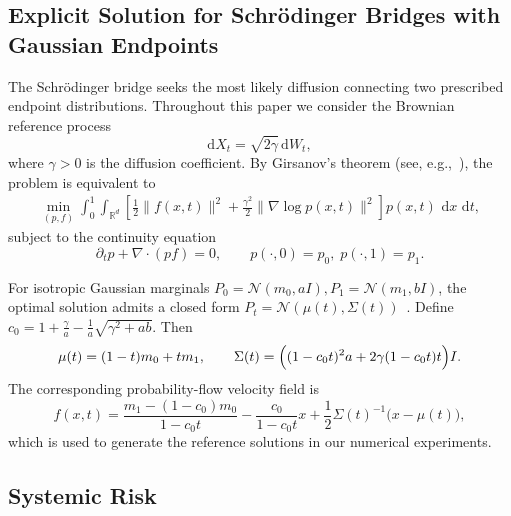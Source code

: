 \documentclass[preprint]{elsarticle}
\newcommand{\rd}{\mathrm{d}}
\newcommand{\dd}{\,\mathrm{d}}          %
\begin{document}
\subsection{Explicit Solution for Schr\"odinger Bridges with Gaussian Endpoints}
\label{sec:appendix_sb}

The Schr\"odinger bridge seeks the most likely diffusion connecting two prescribed endpoint distributions. Throughout this paper we consider the Brownian reference process
\[
\rd X_t=\sqrt{2\gamma}\,\rd W_t,
\]
where $\gamma>0$ is the diffusion coefficient. By Girsanov's theorem (see, e.g.,~\cite{chen2016relation}), the problem is equivalent to
\begin{align}
\min_{(p,f)}
\int_0^1\!\!\int_{\mathbb R^d}
\left[
\frac12\|f(x,t)\|^2
+\frac{\gamma^2}{2}
\|\nabla\log p(x,t)\|^2
\right]
p(x,t)\,\dd x\,\dd t,
\end{align}
subject to the continuity equation
\[
\partial_tp+\nabla\!\cdot(p f)=0,
\qquad
p(\cdot,0)=p_0,\;
p(\cdot,1)=p_1.
\]

For isotropic Gaussian marginals $P_0=\mathcal N(m_0,aI),    P_1=\mathcal N(m_1,bI)$, the optimal solution admits a closed form $P_t=\mathcal N(\mu(t), \Sigma(t))$~\cite{chen2016relation}. Define $c_0= 1+\frac{\gamma}{a}-\frac1a\sqrt{\gamma^2+ab}$. Then
\[
\mu(t)=(1-t)m_0+tm_1, \qquad 
\Sigma(t)
=
\Bigl(
(1-c_0t)^2a
+2\gamma(1-c_0t)t
\Bigr)I.
\]
The corresponding probability-flow velocity field is
\[
f(x,t)
=
\frac{m_1-(1-c_0)m_0}{1-c_0t}
-\frac{c_0}{1-c_0t}x
+\frac12\Sigma(t)^{-1}
\bigl(x-\mu(t)\bigr),
\]
which is used to generate the reference solutions in our numerical experiments.

\subsection{Systemic Risk}\label{sec:appendix_exact_sr}
\end{document}
